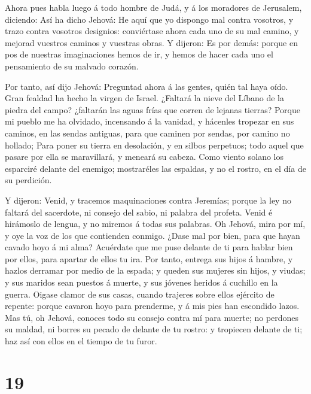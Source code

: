  Ahora pues habla luego á todo hombre de Judá, y á los
moradores de Jerusalem, diciendo: Así ha dicho Jehová: He aquí que yo
dispongo mal contra vosotros, y trazo contra vosotros designios:
conviértase ahora cada uno de su mal camino, y mejorad vuestros caminos
y vuestras obras.  Y dijeron: Es por demás: porque en pos
de nuestras imaginaciones hemos de ir, y hemos de hacer cada uno el
pensamiento de su malvado corazón.

 Por tanto, así dijo Jehová: Preguntad ahora á las gentes,
quién tal haya oído. Gran fealdad ha hecho la virgen de Israel.
 ¿Faltará la nieve del Líbano de la piedra del campo?
¿faltarán las aguas frías que corren de lejanas tierras? 
Porque mi pueblo me ha olvidado, incensando á la vanidad, y hácenles
tropezar en sus caminos, en las sendas antiguas, para que caminen por
sendas, por camino no hollado;  Para poner su tierra en
desolación, y en silbos perpetuos; todo aquel que pasare por ella se
maravillará, y meneará su cabeza.  Como viento solano los
esparciré delante del enemigo; mostraréles las espaldas, y no el rostro,
en el día de su perdición.

 Y dijeron: Venid, y tracemos maquinaciones contra
Jeremías; porque la ley no faltará del sacerdote, ni consejo del sabio,
ni palabra del profeta. Venid é hirámoslo de lengua, y no miremos á
todas sus palabras.  Oh Jehová, mira por mí, y oye la voz
de los que contienden conmigo.  ¿Dase mal por bien, para
que hayan cavado hoyo á mi alma? Acuérdate que me puse delante de ti
para hablar bien por ellos, para apartar de ellos tu ira. 
Por tanto, entrega sus hijos á hambre, y hazlos derramar por medio de la
espada; y queden sus mujeres sin hijos, y viudas; y sus maridos sean
puestos á muerte, y sus jóvenes heridos á cuchillo en la guerra.
 Oigase clamor de sus casas, cuando trajeres sobre ellos
ejército de repente: porque cavaron hoyo para prenderme, y á mis pies
han escondido lazos.  Mas tú, oh Jehová, conoces todo su
consejo contra mí para muerte; no perdones su maldad, ni borres su
pecado de delante de tu rostro: y tropiecen delante de ti; haz así con
ellos en el tiempo de tu furor.

\hypertarget{section-18}{%
\section{19}\label{section-18}}

